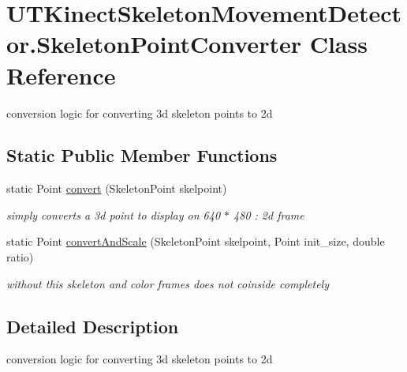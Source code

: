 \hypertarget{classUTKinectSkeletonMovementDetector_1_1SkeletonPointConverter}{\section{U\-T\-Kinect\-Skeleton\-Movement\-Detector.\-Skeleton\-Point\-Converter Class Reference}
\label{classUTKinectSkeletonMovementDetector_1_1SkeletonPointConverter}
}


conversion logic for converting 3d skeleton points to 2d  


\subsection*{Static Public Member Functions}
\begin{DoxyCompactItemize}
\item 
static Point \hyperlink{classUTKinectSkeletonMovementDetector_1_1SkeletonPointConverter_a157fd1dacf2febbac43e5f7d73e68714}{convert} (Skeleton\-Point skelpoint)
\begin{DoxyCompactList}\small\item\em simply converts a 3d point to display on 640 $\ast$ 480 \-: 2d frame \end{DoxyCompactList}\item 
static Point \hyperlink{classUTKinectSkeletonMovementDetector_1_1SkeletonPointConverter_a4c80e4c9498cf339d1c70b067852a51c}{convert\-And\-Scale} (Skeleton\-Point skelpoint, Point init\-\_\-size, double ratio)
\begin{DoxyCompactList}\small\item\em without this skeleton and color frames does not coinside completely \end{DoxyCompactList}\end{DoxyCompactItemize}


\subsection{Detailed Description}
conversion logic for converting 3d skeleton points to 2d 



